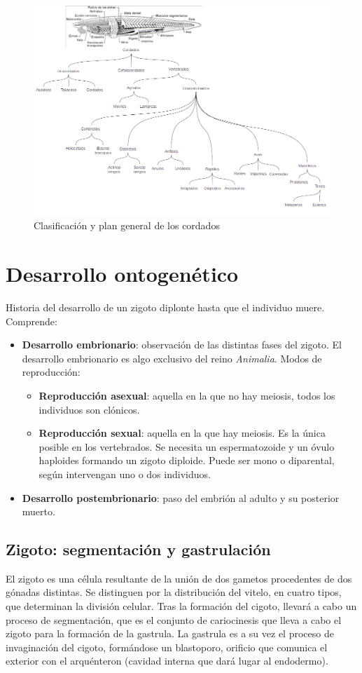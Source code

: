 \begin{figure}[H]
    \centering
    \includegraphics[width=\columnwidth]{A.imagenes/ACV-ANATANIM-Cordados}
    \caption{Clasificación y plan general de los cordados}
\end{figure}
\section{Desarrollo ontogenético}
Historia del desarrollo de un zigoto diplonte hasta que el individuo muere. Comprende:
\begin{itemize}[itemsep=0pt,parsep=0pt,topsep=0pt,partopsep=0pt]
    \item \textbf{Desarrollo embrionario}: observación de las distintas fases del zigoto. El desarrollo embrionario es algo exclusivo del reino \textit{Animalia}. Modos de reproducción:
    \begin{itemize}[itemsep=0pt,parsep=0pt,topsep=0pt,partopsep=0pt]
        \item \textbf{Reproducción asexual}: aquella en la que no hay meiosis, todos los individuos son clónicos.
        \item\textbf{Reproducción sexual}: aquella en la que hay meiosis. Es la única posible en los vertebrados. Se necesita un espermatozoide y un óvulo haploides formando un zigoto diploide. Puede ser mono o diparental, según intervengan uno o dos individuos.
    \end{itemize}
    \item\textbf{Desarrollo postembrionario}: paso del embrión al adulto y su posterior muerto.
\end{itemize}
\subsection{Zigoto: segmentación y gastrulación}
El zigoto es una célula resultante de la unión de dos gametos procedentes de dos gónadas distintas. Se distinguen por la distribución del vitelo, en cuatro tipos, que determinan la división celular.  Tras la formación del cigoto, llevará a cabo un proceso de segmentación, que es el conjunto de cariocinesis que lleva a cabo el zigoto para la formación de la gastrula. La gastrula es a su vez el proceso de invaginación del cigoto, formándose un blastoporo, orificio que comunica el exterior con el arquénteron (cavidad interna que dará lugar al endodermo).

